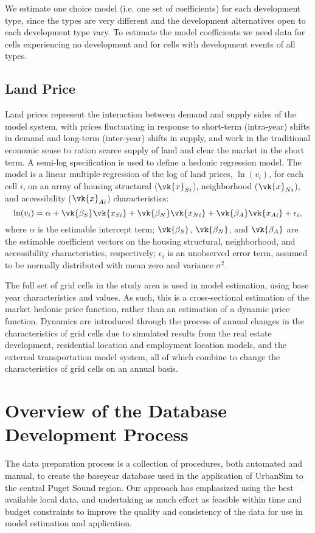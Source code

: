 We estimate one choice model (i.e. one set of coefficients) for
each development type, since the types are very different and the
development alternatives open to each development type vary. To
estimate the model coefficients we need data for cells
experiencing no development and for cells with development events
of all types.


\subsection{Land Price}

Land prices represent the interaction between demand and supply
sides of the model system, with prices fluctuating in response to
short-term (intra-year) shifts in demand and long-term
(inter-year) shifts in supply, and work in the traditional
economic sense to ration scarce supply of land and clear the
market in the short term. A semi-log specification is used to
define a hedonic regression model. The model is a linear
multiple-regression of the log of land prices, $\ln(v_i)$, for
each cell $i$, on an array of housing structural ($\vk{x}_{Si}$),
neighborhood ($\vk{x}_{Ni}$), and accessibility ($\vk{x}_{Ai}$)
characteristics:
\begin{equation}
    \ln(v_i) = \alpha
        + \vk{\beta_S}\vk{x_{Si}}
        + \vk{\beta_N}\vk{x_{Ni}}
        + \vk{\beta_A}\vk{x_{Ai}}
        + \epsilon_i,
\end{equation}
where $\alpha$ is the estimable intercept term; $\vk{\beta_S}$,
$\vk{\beta_N}$, and $\vk{\beta_A}$ are the estimable coefficient
vectors on the housing structural, neighborhood, and accessibility
characteristics, respectively; $\epsilon_i$ is an unobserved error
term, assumed to be normally distributed with mean zero and
variance $\sigma^2$.

The full set of grid cells in the study area is used in model
estimation, using base year characteristics and values. As such,
this is a cross-sectional estimation of the market hedonic price
function, rather than an estimation of a dynamic price function.
Dynamics are introduced through the process of annual changes in
the characteristics of grid cells due to simulated results from
the real estate development, residential location and employment
location models, and the external transportation model system, all
of which combine to change the characteristics of grid cells on an
annual basis.

\section{Overview of the Database Development Process}
The data preparation process is a collection of procedures, both
automated and manual, to create the baseyear database used in the
application of UrbanSim to the central Puget Sound region. Our
approach has emphasized using the best available local data, and
undertaking as much effort as feasible within time and budget
constraints to improve the quality and consistency of the data for
use in model estimation and application.

